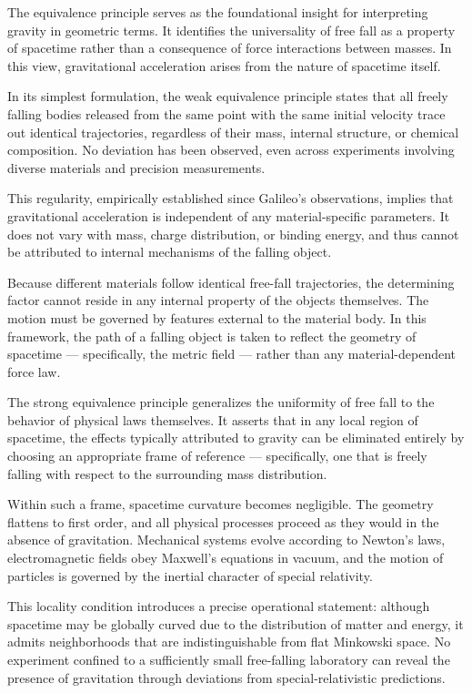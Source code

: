 The equivalence principle serves as the foundational insight for interpreting gravity in geometric terms. It identifies the universality of free fall as a property of spacetime rather than a consequence of force interactions between masses. In this view, gravitational acceleration arises from the nature of spacetime itself.

In its simplest formulation, the weak equivalence principle states that all freely falling bodies released from the same point with the same initial velocity trace out identical trajectories, regardless of their mass, internal structure, or chemical composition. No deviation has been observed, even across experiments involving diverse materials and precision measurements.

This regularity, empirically established since Galileo’s observations, implies that gravitational acceleration is independent of any material-specific parameters. It does not vary with mass, charge distribution, or binding energy, and thus cannot be attributed to internal mechanisms of the falling object.

Because different materials follow identical free-fall trajectories, the determining factor cannot reside in any internal property of the objects themselves. The motion must be governed by features external to the material body. In this framework, the path of a falling object is taken to reflect the geometry of spacetime — specifically, the metric field — rather than any material-dependent force law.

The strong equivalence principle generalizes the uniformity of free fall to the behavior of physical laws themselves. It asserts that in any local region of spacetime, the effects typically attributed to gravity can be eliminated entirely by choosing an appropriate frame of reference — specifically, one that is freely falling with respect to the surrounding mass distribution.

Within such a frame, spacetime curvature becomes negligible. The geometry flattens to first order, and all physical processes proceed as they would in the absence of gravitation. Mechanical systems evolve according to Newton’s laws, electromagnetic fields obey Maxwell’s equations in vacuum, and the motion of particles is governed by the inertial character of special relativity.

This locality condition introduces a precise operational statement: although spacetime may be globally curved due to the distribution of matter and energy, it admits neighborhoods that are indistinguishable from flat Minkowski space. No experiment confined to a sufficiently small free-falling laboratory can reveal the presence of gravitation through deviations from special-relativistic predictions.


